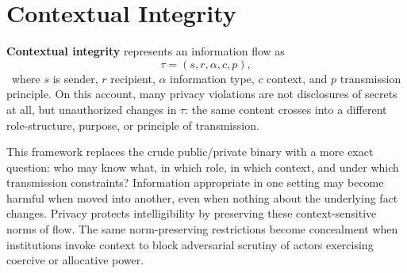 
\chapter{Contextual Integrity}
\label{ch:ch031}

\textbf{Contextual integrity} represents an information flow as
\[
\tau=(s,r,\alpha,c,p),
\]
\Definition\ where \(s\) is sender, \(r\) recipient, \(\alpha\) information type, \(c\) context, and \(p\) transmission principle. On this account, many privacy violations are not disclosures of secrets at all, but unauthorized changes in \(\tau\): the same content crosses into a different role-structure, purpose, or principle of transmission.

This framework replaces the crude public/private binary with a more exact question: who may know what, in which role, in which context, and under which transmission constraints? Information appropriate in one setting may become harmful when moved into another, even when nothing about the underlying fact changes. Privacy protects intelligibility by preserving these context-sensitive norms of flow. The same norm-preserving restrictions become concealment when institutions invoke context to block adversarial scrutiny of actors exercising coercive or allocative power.
